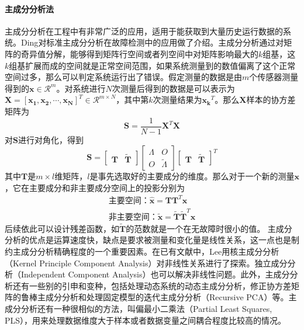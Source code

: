 \paragraph*{主成分分析法}
主成分分析\cite{jolliffe2002principal}在工程中有非常广泛的应用，适用于能获取到大量历史运行数据的系统。Ding\cite{Ding2010138}对标准主成分分析在故障检测中的应用做了介绍。主成分分析通过对矩阵的奇异值分解，能够得到矩阵行空间或者列空间中对矩阵影响最大的$k$组基，这$k$组基扩展而成的空间就是正常空间范围，如果系统测量到的数值偏离了这个正常空间过多，那么可以判定系统运行出了错误。假定测量的数据是由$m$个传感器测量得到的$\mathbf{x}\in \mathcal{R}^m$。对系统进行$N$次测量后得到的数据是可以表示为$\mathbf{X}=[\mathbf{x_1},\mathbf{x_2},\cdots,\mathbf{x_N}]^T\in \mathcal{R}^{m\times N}$，其中第$k$次测量结果为$\mathbf{x_k}^T$。那么$\mathbf{X}$样本的协方差矩阵为
\begin{equation*}
    \mathbf{S} = \frac{1}{N-1}\mathbf{X}^T\mathbf{X}
\end{equation*}
对$\mathbf{S}$进行对角化，得到
\begin{equation*}
\mathbf{S}=\begin{bmatrix}\mathbf{T}& \tilde{\mathbf{T}}\end{bmatrix}\begin{bmatrix}\Lambda& O\\O&\tilde{\Lambda}\end{bmatrix}\begin{bmatrix}\mathbf{T}& \tilde{\mathbf{T}}\end{bmatrix}^T
\end{equation*}
其中$\mathbf{T}$是$m\times l$维矩阵，$l$是事先选取好的主要成分的维度。那么对于一个新的测量$\mathbf{x}$，它在主要成分和非主要成分空间上的投影分别为
\begin{eqnarray}
\text{主要空间：}\hat{\mathbf{x}} = \mathbf{TT}^T\mathbf{x} \\
\text{非主要空间：}\tilde{\mathbf{x}} = \tilde{\mathbf{T}}\tilde{\mathbf{T}}^T\mathbf{x}
\end{eqnarray}
后续依此可以设计残差函数，如$\tilde{\mathbf{T}}$的范数就是一个在无故障时很小的值。
主成分分析的优点是运算速度快，缺点是要求被测量和变化量是线性关系，这一点也是制约主成分分析精确程度的一个重要因素。在已有文献中，Lee\cite{Lee2004223}用核主成分分析（Kernel Principle Component Analysis）对非线性关系进行了探索。独立成分分析（Independent Component Analysis）也可以解决非线性问题\cite{Li20111015}。此外，主成分分析还有一些别的引申和变种\cite{Luo1999sensor,Harkat2006625,4602224,Misra20021281}，包括处理动态系统的动态主成分分析\cite{Luo1999sensor}，修正协方差矩阵的鲁棒主成分分析\cite{4602224}和处理固定模型的迭代主成分分析（Recursive PCA）等。主成分分析还有一种很相似的方法，叫偏最小二乘法（Partial Least Squares, PLS），用来处理数据维度大于样本或者数据变量之间耦合程度比较高的情况\cite{Wang2003613,JOEQIN1998503,6873303}。

